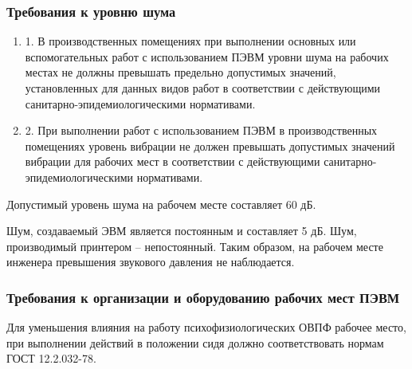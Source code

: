 \subsubsection{Требования к уровню шума}

\begin{enumerate}
 \item 1. В производственных помещениях при выполнении основных или вспомогательных работ с использованием ПЭВМ уровни шума на рабочих местах не должны превышать предельно допустимых значений, установленных для данных видов работ в соответствии с действующими санитарно-эпидемиологическими нормативами.
 \item 2. При выполнении работ с использованием ПЭВМ в производственных помещениях уровень вибрации не должен превышать допустимых значений вибрации для рабочих мест в соответствии с действующими санитарно-эпидемиологическими нормативами.
\end{enumerate}

Допустимый уровень шума на рабочем месте составляет 60 дБ.

Шум, создаваемый ЭВМ является постоянным и составляет 5 дБ. Шум, производимый принтером – непостоянный. Таким образом, на рабочем месте инженера превышения звукового давления не наблюдается.

\subsubsection{Требования к организации и оборудованию рабочих мест ПЭВМ}

Для уменьшения влияния на работу психофизиологических ОВПФ рабочее место, при выполнении действий в положении сидя должно соответствовать нормам ГОСТ 12.2.032-78.

